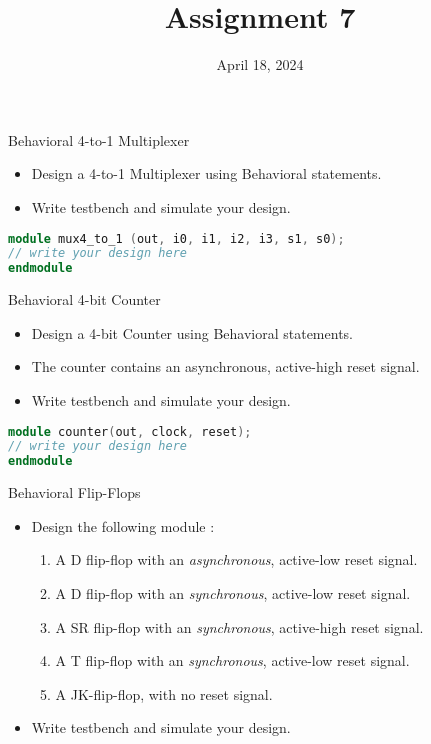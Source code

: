 \documentclass{vhdl-assignment}
\title{Assignment 7}
\date{April 18, 2024}
\begin{document}
\maketitle
\thispagestyle{fancy}

\begin{problem}{Behavioral 4-to-1 Multiplexer}
    \begin{itemize}
        \item Design a 4-to-1 Multiplexer using Behavioral statements.
        \item Write testbench and simulate your design.
    \end{itemize}

    \begin{lstlisting}[language=Verilog, numbers=none]
module mux4_to_1 (out, i0, i1, i2, i3, s1, s0);
// write your design here
endmodule
\end{lstlisting}
\end{problem}

\begin{problem}{Behavioral 4-bit Counter}
    \begin{itemize}
        \item Design a 4-bit Counter using Behavioral statements.
        \item The counter contains an asynchronous, active-high reset signal.
        \item Write testbench and simulate your design.
    \end{itemize}
        \begin{lstlisting}[language=Verilog, numbers=none]
module counter(out, clock, reset);
// write your design here
endmodule
\end{lstlisting}
\end{problem}

\begin{problem}{Behavioral Flip-Flops}
    \begin{itemize}
        \item Design the following module :
        \begin{enumerate}
            \item A D flip-flop with an \emph{asynchronous}, active-low reset signal.
            \item A D flip-flop with an \emph{synchronous}, active-low reset signal.
            \item A SR flip-flop with an \emph{synchronous}, active-high reset signal.
            \item A T flip-flop with an \emph{synchronous}, active-low reset signal.
            \item A JK-flip-flop, with no reset signal.
        \end{enumerate}
        \item Write testbench and simulate your design.
    \end{itemize}
\end{problem}
\end{document}
